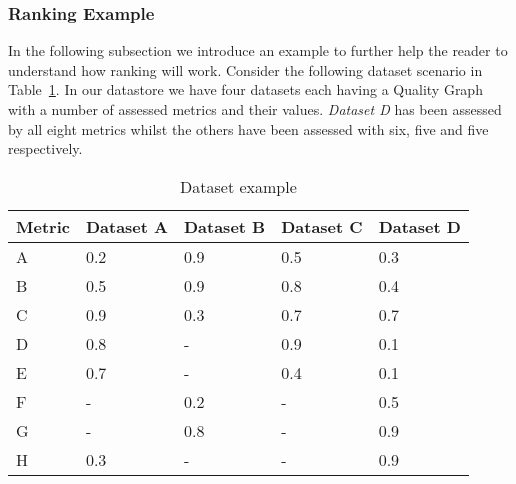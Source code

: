 \subsubsection{Ranking Example}
In the following subsection we introduce an example to further help the reader to understand how ranking will work.
Consider the following dataset scenario in Table~\ref{tbl:datasets}.
In our datastore we have four datasets each having a Quality Graph with a number of assessed metrics and their values.
\textit{Dataset D} has been assessed by all eight metrics whilst the others have been assessed with six, five and five respectively.
\begin{table}[tbph]
\center
    \begin{tabular}{|l|l|l|l|l|}
    \hline
    \textbf{Metric} & \textbf{Dataset A} & \textbf{Dataset B} & \textbf{Dataset C} & \textbf{Dataset D} \\   \hline
    A      & 0.2       & 0.9       & 0.5       & 0.3       \\  \hline
    B      & 0.5       & 0.9       & 0.8       & 0.4       \\  \hline
    C      & 0.9       & 0.3       & 0.7       & 0.7       \\  \hline
    D      & 0.8       & -         & 0.9       & 0.1       \\  \hline
    E      & 0.7       & -         & 0.4       & 0.1       \\  \hline
    F      & -         & 0.2       & -         & 0.5       \\  \hline
    G      & -         & 0.8       & -         & 0.9       \\  \hline
    H      & 0.3       & -         & -         & 0.9       \\  \hline
    \end{tabular}
    \label{tbl:datasets}
    \caption{Dataset example}
\end{table}

